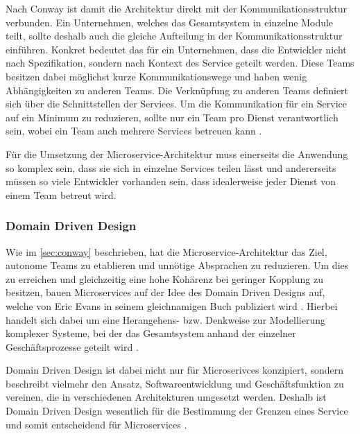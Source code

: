 Nach Conway ist damit die Architektur direkt mit der Kommunikationsstruktur verbunden. Ein Unternehmen, welches das Gesamtsystem in einzelne Module teilt, sollte deshalb auch die gleiche Aufteilung in der Kommunikationsstruktur einführen. Konkret bedeutet das für ein Unternehmen, dass die Entwickler nicht nach Spezifikation, sondern nach Kontext des Service geteilt werden. Diese Teams besitzen dabei möglichst kurze Kommunikationswege und haben wenig Abhängigkeiten zu anderen Teams. Die Verknüpfung zu anderen Teams definiert sich über die Schnittstellen der Services.
Um die Kommunikation für ein Service auf ein Minimum zu reduzieren, sollte nur ein Team pro Dienst verantwortlich sein, wobei ein Team auch mehrere Services betreuen kann \parencite[vgl.][Kap. 4.2]{wolff_microservices_2018}. 

Für die Umsetzung der Microservice-Architektur muss einerseits die Anwendung so komplex sein, dass sie sich in einzelne Services teilen lässt und andererseits müssen so viele Entwickler vorhanden sein, dass idealerweise jeder Dienst von einem Team betreut wird.

\subsubsection{Domain Driven Design}
\label{sec:ddd}

Wie im \cref{sec:conway} beschrieben, hat die Microservice-Architektur das Ziel, autonome Teams zu etablieren und unnötige Absprachen zu reduzieren. Um dies zu erreichen und gleichzeitig eine hohe Kohärenz bei geringer Kopplung zu besitzen, bauen Microservices auf der Idee des Domain Driven Designs auf, welche von Eric Evans in seinem gleichnamigen Buch publiziert wird \parencite[vgl.][Kap. 2.4]{newman_monolith_2019}. Hierbei handelt sich dabei um eine Herangehens- bzw. Denkweise zur Modellierung komplexer Systeme, bei der das Gesamtsystem anhand der einzelner Geschäftsprozesse geteilt wird \parencite[vgl.][S. xix ff.]{evans_domain-driven_2003}.

Domain Driven Design ist dabei nicht nur für Microserivces konzipiert, sondern beschreibt vielmehr den Ansatz, Softwareentwicklung und Geschäftsfunktion zu vereinen, die in verschiedenen Architekturen umgesetzt werden. Deshalb ist Domain Driven Design wesentlich für die Bestimmung der Grenzen eines Service und somit entscheidend für Microservices \parencite[vgl.][Kap. 4.3]{wolff_microservices_2018}.

